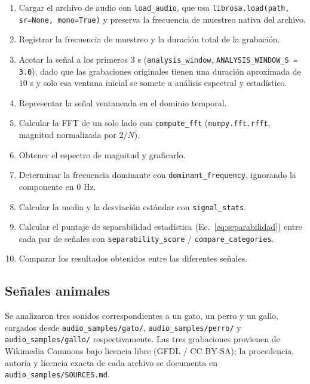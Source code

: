 \begin{enumerate}

\item Cargar el archivo de audio con \texttt{load\_audio}, que usa \texttt{librosa.load(path, sr=None, mono=True)} y preserva la frecuencia de muestreo nativa del archivo.

\item Registrar la frecuencia de muestreo y la duración total de la grabación.

\item Acotar la señal a los primeros $3$ s (\texttt{analysis\_window}, \texttt{ANALYSIS\_WINDOW\_S = 3.0}), dado que las grabaciones originales tienen una duración aproximada de $10$ s y solo esa ventana inicial se somete a análisis espectral y estadístico.

\item Representar la señal ventaneada en el dominio temporal.

\item Calcular la FFT de un solo lado con \texttt{compute\_fft} (\texttt{numpy.fft.rfft}, magnitud normalizada por $2/N$).

\item Obtener el espectro de magnitud y graficarlo.

\item Determinar la frecuencia dominante con \texttt{dominant\_frequency}, ignorando la componente en $0$ Hz.

\item Calcular la media y la desviación estándar con \texttt{signal\_stats}.

\item Calcular el puntaje de separabilidad estadística (Ec.~\ref{eq:separabilidad}) entre cada par de señales con \texttt{separability\_score} / \texttt{compare\_categories}.

\item Comparar los resultados obtenidos entre las diferentes señales.

\end{enumerate}

\subsection{Señales animales}

Se analizaron tres sonidos correspondientes a un gato, un perro y un gallo, cargados desde \texttt{audio\_samples/gato/}, \texttt{audio\_samples/perro/} y \texttt{audio\_samples/gallo/} respectivamente. Las tres grabaciones provienen de Wikimedia Commons bajo licencia libre (GFDL / CC BY-SA); la procedencia, autoría y licencia exacta de cada archivo se documenta en \texttt{audio\_samples/SOURCES.md}.

